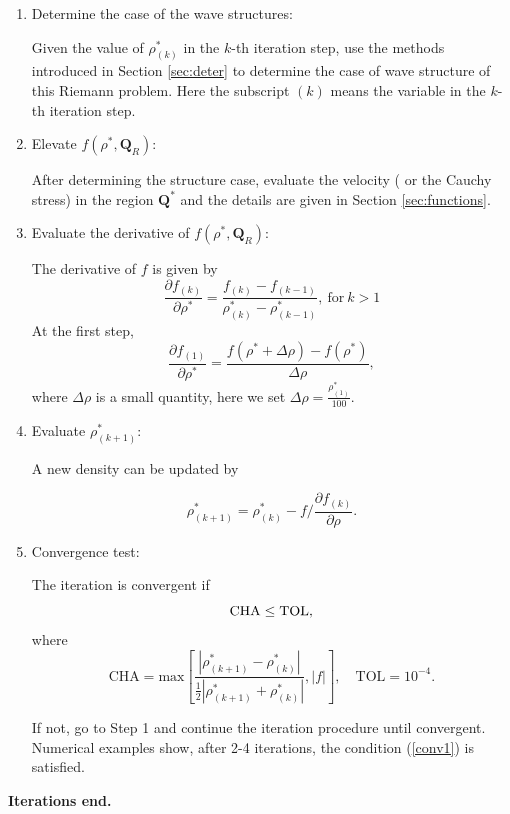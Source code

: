 \documentclass[review]{elsarticle}
\numberwithin{equation}{section}
\numberwithin{table}{section}
\begin{document}
\begin{enumerate}[Step 1]
  \item Determine the case of the wave structures:

	Given the value of  $\rho _{(k)}^*$ in the $k$-th iteration step, use the methods introduced in Section \ref{sec:deter} to determine the case of wave structure of this Riemann problem. Here the subscript $(k)$ means the variable in the $k$-th  iteration step.


  \item Elevate $f(\rho^*,\mathbf{Q}_R)$:
	
	After determining the structure case, evaluate the velocity ( or  the Cauchy stress) in  the region $\mathbf{Q}^*$ and the details are given in Section \ref{sec:functions}.

  \item Evaluate the derivative of  $f(\rho^*,\mathbf{Q}_R)$:

The derivative of $f$ is  given by
\begin{equation*}
  \frac{\partial f_{(k)}}{\partial \rho^*} = \frac{f_{(k)}-f_{(k-1)}}{\rho_{(k)}^* - \rho^*_{(k-1)}}, \ \text{for} \ k>1
\end{equation*}
At the first step, %
\begin{equation*}
  \frac{\partial f_{(1)}}{\partial \rho^*} = \frac{f(\rho^*+\Delta \rho)-f(\rho^*)}{\Delta \rho},
\end{equation*}
where $\Delta \rho$ is a small quantity, here we set $\Delta \rho = \frac{\rho_{(1)}^*}{100}$.

  \item  Evaluate  $\rho^*_{(k+1)}$:
	
A new density can be updated by

\begin{equation*}
 \rho^*_{(k+1)} = \rho^*_{(k)}- f/\frac{\partial f_{(k)}}{\partial \rho}.
\end{equation*}

\item Convergence test:


The iteration is convergent if
\begin{equation}{\label{conv1}}
  \text{CHA} \le \text{TOL},
\end{equation}
where
\begin{equation*}
\text{CHA} = \text{max} \left[
\frac{|\rho_{(k+1)}^*- \rho_{(k)}^*|}{\frac{1}{2}|\rho_{(k+1)}^*+\rho_{(k)}^*|},|f|\right], \quad \text{TOL} = 10^{-4}.
\end{equation*}

If not, go to Step 1 and continue the iteration procedure until convergent. Numerical examples show, after 2-4 iterations, the condition (\ref{conv1}) is satisfied.
\end{enumerate}
\textbf{Iterations end.}
\end{document}
